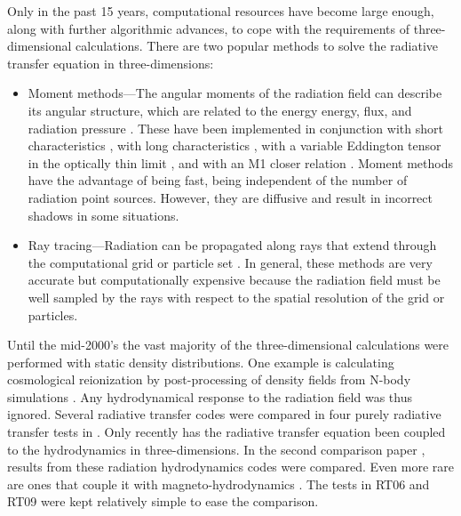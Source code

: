 \documentclass[apj,onecolumn]{emulateapj}
\begin{document}
Only in the past 15 years, computational resources have become large
enough, along with further algorithmic advances, to cope with the
requirements of three-dimensional calculations.  There are two popular
methods to solve the radiative transfer equation in three-dimensions:
%
\begin{itemize}
\item Moment methods---The angular moments of the radiation field can
  describe its angular structure, which are related to the energy
  energy, flux, and radiation pressure \citep{Auer70, Norman98}.
  These have been implemented in conjunction with short
  characteristics \citep[2D]{Stone92_RHD}, with long characteristics
  \citep{Finlator09}, with a variable Eddington tensor in the
  optically thin limit \citep[OTVET;][]{Gnedin01_OTVET, Petkova09},
  and with an M1 closer relation \citep{Gonzalez07, Aubert08}.  Moment
  methods have the advantage of being fast, being independent of the
  number of radiation point sources.  However, they are diffusive and
  result in incorrect shadows in some situations.
\item Ray tracing---Radiation can be propagated along rays that extend
  through the computational grid \citep[e.g.][]{Razoumov99, Abel99_RT,
    Ciardi01, Sokasian01, Whalen06, Rijkhorst06, Mellema06, Alvarez06,
    Trac07, Krumholz07_ART, Paardekooper10} or particle set
  \citep[e.g.][]{Susa06, Johnson07, Pawlik08, Pawlik10, Altay08,
    Hasegawa09}.  In general, these methods are very accurate but
  computationally expensive because the radiation field must be well
  sampled by the rays with respect to the spatial resolution of the
  grid or particles.
\end{itemize}
%
Until the mid-2000's the vast majority of the three-dimensional
calculations were performed with static density distributions.  One
example is calculating cosmological reionization by post-processing of
density fields from N-body simulations \citep{Ciardi01, Sokasian01,
  McQuinn07, Iliev06, Iliev07}.  Any hydrodynamical response to the
radiation field was thus ignored.  Several radiative transfer codes
were compared in four purely radiative transfer tests in
\citet[hereafter RT06]{RT06}.  Only recently has the radiative
transfer equation been coupled to the hydrodynamics in
three-dimensions.  In the second comparison paper \citep[hereafter
  RT09]{Iliev09}, results from these radiation hydrodynamics codes
were compared.  Even more rare are ones that couple it with
magneto-hydrodynamics \citep[e.g.][]{Krumholz07_ART}.  The tests in
RT06 and RT09 were kept relatively simple to ease the comparison.
\end{document}
